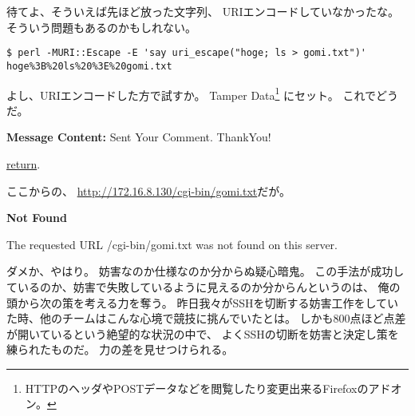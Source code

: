 待てよ、そういえば先ほど放った文字列、
URIエンコードしていなかったな。
そういう問題もあるのかもしれない。

\begin{lstlisting}
$ perl -MURI::Escape -E 'say uri_escape("hoge; ls > gomi.txt")'
hoge%3B%20ls%20%3E%20gomi.txt
\end{lstlisting}

よし、URIエンコードした方で試すか。
Tamper Data\footnote{HTTPのヘッダやPOSTデータなどを閲覧したり変更出来るFirefoxのアドオン。}%
にセット。
これでどうだ。

\begin{itembox}[c]{\textbf{Message Content:}}
Sent Your Comment. ThankYou!

\underline{return}. 
\end{itembox}

ここからの、
\url{http://172.16.8.130/cgi-bin/gomi.txt}だが。

\begin{itembox}[c]{\textbf{Not Found}}

The requested URL /cgi-bin/gomi.txt was not found on this server.
\end{itembox}

ダメか、やはり。
妨害なのか仕様なのか分からぬ疑心暗鬼。
この手法が成功しているのか、妨害で失敗しているように見えるのか分からんというのは、
俺の頭から次の策を考える力を奪う。
昨日我々がSSHを切断する妨害工作をしていた時、他のチームはこんな心境で競技に挑んでいたとは。
しかも800点ほど点差が開いているという絶望的な状況の中で、
よくSSHの切断を妨害と決定し策を練られたものだ。
力の差を見せつけられる。


